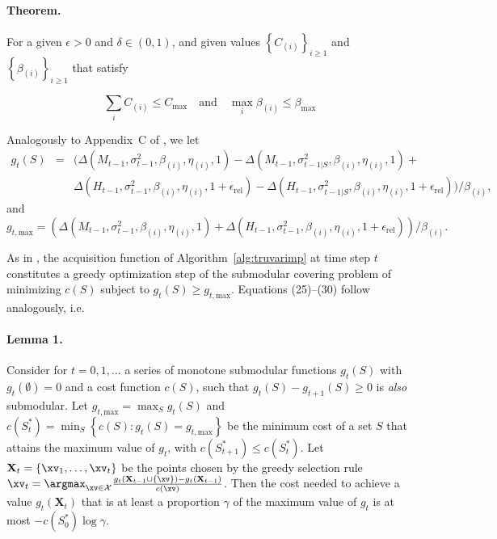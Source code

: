 \documentclass[a4paper,10pt]{article}
\newcommand{\cset}{\mathcal{X}}
\begin{document}
\paragraph{Theorem.} For a given $\epsilon > 0$ and $\delta \in (0,1)$, and given values $\left\{C_{(i)}\right\}_{i\ge 1}$ and $\left\{\beta_{(i)}\right\}_{i\ge 1}$ that satisfy

\begin{equation}
    \sum_{i} C_{(i)} \le C_{\max} \quad \text{and} \quad \max_{i} \beta_{(i)} \le \beta_{\max}
\end{equation}

Analogously to Appendix~C of \citet{truvar2024}, we let
\begin{eqnarray*}
    g_t(S) & = &\bigl(\Delta (M_{t-1}, \sigma_{t-1}^2, \beta_{(i)}, \eta_{(i)}, 1) - \Delta (M_{t-1}, \sigma_{t-1|S}^2, \beta_{(i)}, \eta_{(i)}, 1) + \\
    && \Delta (H_{t-1}, \sigma_{t-1}^2, \beta_{(i)}, \eta_{(i)}, 1 + \epsilon_{\mathrm{rel}}) - \Delta (H_{t-1}, \sigma_{t-1|S}^2, \beta_{(i)}, \eta_{(i)}, 1 + \epsilon_{\mathrm{rel}})\bigr) / \beta_{(i)}
    \mathrm{,}
\end{eqnarray*}
and
\begin{equation}
    g_{t,\mathrm{max}} = \left(\Delta (M_{t-1}, \sigma_{t-1}^2, \beta_{(i)}, \eta_{(i)}, 1) + \Delta (H_{t-1}, \sigma_{t-1}^2, \beta_{(i)}, \eta_{(i)}, 1 + \epsilon_{\mathrm{rel}})\right) / \beta_{(i)}\mathrm{.}
\end{equation}

As in \citet{truvar2024}, the acquisition function of Algorithm~\ref{alg:truvarimp} at time step $t$ constitutes a greedy optimization step of the submodular covering problem of minimizing $c(S)$ subject to $g_t(S) \ge g_{t,\mathrm{max}}$. Equations (25)--(30) follow analogously, i.e.\




\paragraph{Lemma 1.} Consider for $t = 0, 1, \ldots$ a series of monotone submodular functions $g_t(S)$ with $g_t(\emptyset) = 0$ and a cost function $c(S)$, such that $g_{t}(S) - g_{t+1}(S) \ge 0$ is \emph{also} submodular.
Let $g_{t,\mathrm{max}} = \max_S g_{t}(S)$ and $c(S_t^*) = \min_{S} \left\{ c(S) : g_{t}(S) = g_{t,\mathrm{max}} \right\}$ be the minimum cost of a set $S$ that attains the maximum value of $g_{t}$, with $c(S_{t+1}^*) \le c(S_t^*)$.
Let $\mathbf{X}_t = \{\xv_1, \ldots, \xv_t\}$ be the points chosen by the greedy selection rule $\xv_t = \argmax_{\xv \in \cset} \frac{g_{t}(\mathbf{X}_{t-1} \cup \{\xv\}) - g_{t}(\mathbf{X}_{t-1})}{c(\xv)} $.
Then the cost needed to achieve a value $g_{t}(\mathbf{X}_{t})$ that is at least a proportion $\gamma$ of the maximum value of $g_t$ is at most $-c(S_0^*) \log\gamma$.
\end{document}
